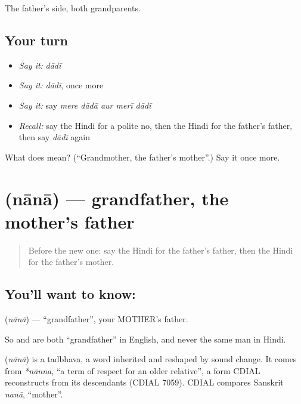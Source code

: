 \begin{grammarlens}[title={What you've built}]
The father's side, both grandparents.
\end{grammarlens}

\subsection*{Your turn}
\begin{itemize}
\raggedright
  \item \emph{Say it:} \emph{dādī}
  \item \emph{Say it:} \emph{dādī}, once more
  \item \emph{Say it:} say \emph{mere dādā aur merī dādī}
  \item \emph{Recall:} say the Hindi for a polite no, then the Hindi for the father's father, then say \emph{dādī} again
\end{itemize}

\begin{tcolorbox}[breakable,colback=teal!4,colframe=teal!35!black,title={Before you move on}]
What does  mean? (\textquotedblleft{}Grandmother, the father's mother\textquotedblright{}.) Say it once more.
\end{tcolorbox}
\section[\texorpdfstring{\hi{नाना} (nānā)}{नाना (nānā)}]{ (nānā) — grandfather, the mother's father}

\label{lesson:HI-C116-nana}



\begin{quote}
Before the new one: say the Hindi for the father's father, then the Hindi for the father's mother.
\end{quote}

\subsection*{You'll want to know: }
\textbf{} (\emph{nānā}) — \textquotedblleft{}grandfather\textquotedblright{}, your MOTHER's father.

So \textbf{} and \textbf{} are both \textquotedblleft{}grandfather\textquotedblright{} in English, and never the same man in Hindi.

\begin{cousinweb}
\textbf{} (\emph{nānā}) is a tadbhava, a word inherited and reshaped by sound change. It comes from \emph{*nānna}, \textquotedblleft{}a term of respect for an older relative\textquotedblright{}, a form CDIAL reconstructs from its descendants (CDIAL 7059). CDIAL compares Sanskrit \emph{nanā}, \textquotedblleft{}mother\textquotedblright{}.
\end{cousinweb}


